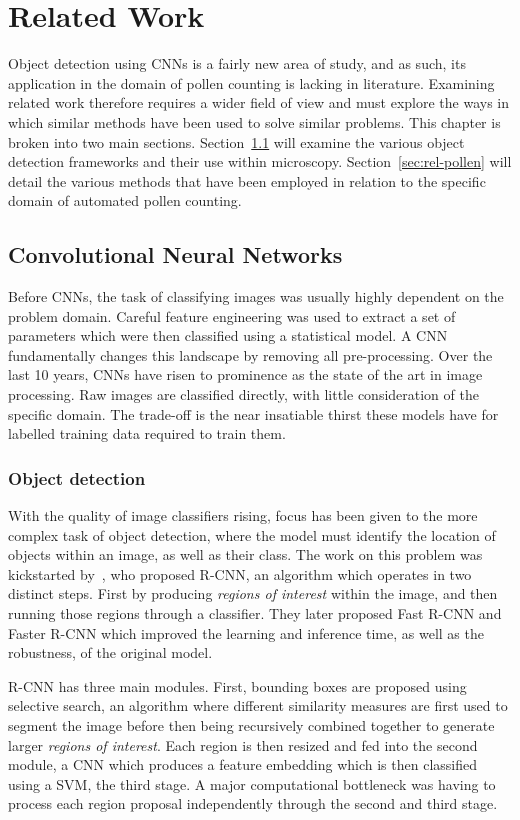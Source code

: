 \chapter{Related Work}\label{cha:related}
Object detection using CNNs is a fairly new area of study, and as such, its application in the domain of pollen counting is lacking in literature.
Examining related work therefore requires a wider field of view and must explore the ways in which similar methods have been used to solve similar problems.
This chapter is broken into two main sections.
Section~\ref{sec:rel-cnn} will examine the various object detection frameworks and their use within microscopy.
Section~\ref{sec:rel-pollen} will detail the various methods that have been employed in relation to the specific domain of automated pollen counting.

\section{Convolutional Neural Networks}\label{sec:rel-cnn}
Before CNNs, the task of classifying images was usually highly dependent on the problem domain.
Careful feature engineering was used to extract a set of parameters which were then classified using a statistical model.
A CNN fundamentally changes this landscape by removing all pre-processing.
Over the last 10 years, CNNs have risen to prominence as the state of the art in image processing.
Raw images are classified directly, with little consideration of the specific domain.
The trade-off is the near insatiable thirst these models have for labelled training data required to train them.

\subsection{Object detection}
With the quality of image classifiers rising, focus has been given to the more complex task of object detection, where the model must identify the location of objects within an image, as well as their class.
The work on this problem was kickstarted by~\cite{girshick_rich_2014}, who proposed R-CNN, an algorithm which operates in two distinct steps.
First by producing \textit{regions of interest} within the image, and then running those regions through a classifier.
They later proposed Fast R-CNN and Faster R-CNN which improved the learning and inference time, as well as the robustness, of the original model.

R-CNN has three main modules.
First, bounding boxes are proposed using selective search, an algorithm where different similarity measures are first used to segment the image before then being recursively combined together to generate larger \textit{regions of interest}.
Each region is then resized and fed into the second module, a CNN which produces a feature embedding which is then classified using a SVM, the third stage.
A major computational bottleneck was having to process each region proposal independently through the second and third stage.

